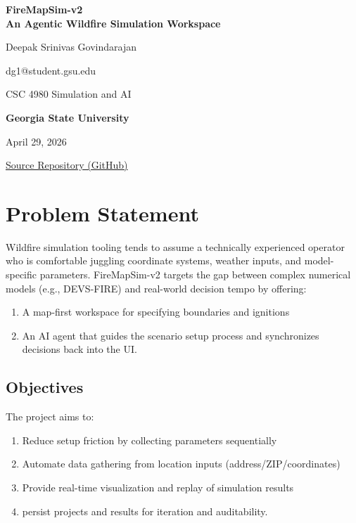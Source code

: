 \documentclass[12pt]{article}
\makeatletter
\newcommand{\ReportTitle}{FireMapSim-v2 \\ An Agentic Wildfire Simulation Workspace}
\newcommand{\AuthorName}{Deepak Srinivas Govindarajan}
\newcommand{\AuthorEmail}{dg1@student.gsu.edu}
\newcommand{\CourseName}{{CSC 4980 Simulation and AI}}
\newcommand{\InstitutionName}{\textbf{Georgia State University}}
\newcommand{\SubmissionDate}{April 29, 2026}
\makeatother
\begin{document}
\begin{titlepage}
  \centering
  \vspace*{\fill}

  {\LARGE \textbf{\ReportTitle}\par}
  \vspace{0.25in}

  {\large \textbf{} \AuthorName \par \AuthorEmail \par}
  \vspace{0.25in}

  {\large \textbf{} \CourseName\par}
  \vspace{0.1in}
  {\large \InstitutionName\par}
  \vspace{0.2in}
  {\large \SubmissionDate\par}
  \vspace{0.2in}
  {\large \href{https://github.com/1DeepakSrinivas/firemapsim-v2}{Source Repository (GitHub)}}
  \vspace*{\fill}
\end{titlepage}



\section{Problem Statement}
Wildfire simulation tooling tends to assume a technically experienced operator who is comfortable juggling coordinate systems, weather inputs, and model-specific parameters. FireMapSim-v2 targets the gap between complex numerical models (e.g., DEVS-FIRE) and real-world decision tempo by offering:
\begin{enumerate}
    \item A map-first workspace for specifying boundaries and ignitions
    \item An AI agent that guides the scenario setup process and synchronizes decisions back into the UI.
\end{enumerate}

\subsection{Objectives}
The project aims to:
\begin{enumerate}
    \item Reduce setup friction by collecting parameters sequentially
    \item Automate data gathering from location inputs (address/ZIP/coordinates)
    \item Provide real-time visualization and replay of simulation results
    \item persist projects and results for iteration and auditability.
\end{enumerate}
\end{document}
